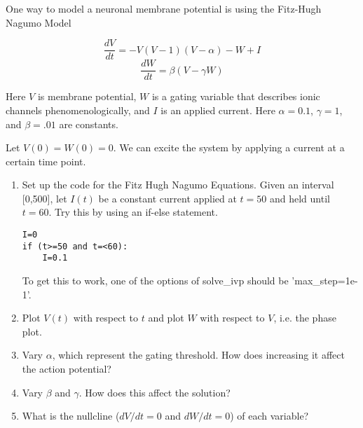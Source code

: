 \documentclass[12pt]{article}
\begin{document}
One way to model a neuronal membrane potential is using the Fitz-Hugh Nagumo Model

$$\frac{dV}{dt}=-V(V-1)(V-\alpha)-W+I $$
$$\frac{dW}{dt}=\beta(V-\gamma W) $$

Here $V$ is membrane potential, $W$ is a gating variable that describes ionic channels phenomenologically, and $I$ is an applied current. Here $\alpha=0.1$, $\gamma=1$, and $\beta=.01$ are constants.

Let $V(0)=W(0)=0$. We can excite the system by applying a current at a certain time point. 

\begin{enumerate}
	\item Set up the code for the Fitz Hugh Nagumo Equations. Given an interval [0,500], let $I(t)$ be a constant current applied at $t=50$ and held until $t=60$. Try this by using an if-else statement.

\begin{verbatim}
I=0
if (t>=50 and t=<60):
    I=0.1 
\end{verbatim}

To get this to work, one of the options of solve\_ivp should be 'max\_step=1e-1'.

\item Plot $V(t)$ with respect to $t$ and plot $W$ with respect to $V$, i.e. the phase plot.



\item Vary $\alpha$, which represent the gating threshold. How does increasing it affect the action potential?

\item Vary $\beta$ and $\gamma$. How does this affect the solution?

\item What is the nullcline ($dV/dt=0$ and $dW/dt=0$) of each variable?
\end{enumerate}
\end{document}
